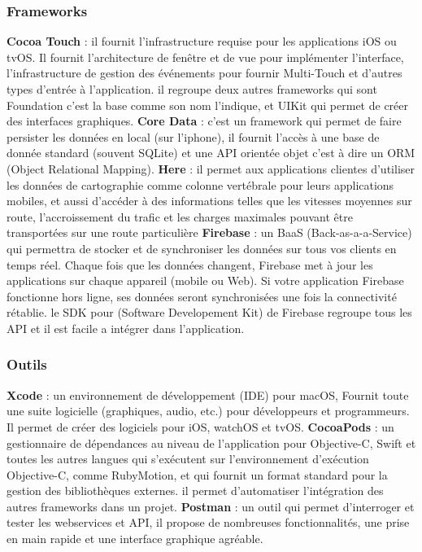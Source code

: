 \subsubsection{Frameworks} %
\label{ssub:subsubsection_name}
\begin{itemize}
	\itemb \textbf{Cocoa Touch} : il fournit l'infrastructure requise pour les applications iOS ou tvOS. Il fournit l'architecture de fenêtre et de vue pour implémenter l'interface, l'infrastructure de gestion des événements pour fournir Multi-Touch et d'autres types d'entrée à l'application.
	il regroupe deux autres frameworks qui sont Foundation c'est la base comme son nom l'indique, et UIKit
	qui permet de créer des interfaces graphiques.
	\itemb \textbf{Core Data} : c'est un framework qui permet de faire persister les données en local (sur l'iphone), il fournit l’accès à une base de donnée standard (souvent SQLite) et une API orientée objet c'est à dire un ORM (Object Relational Mapping).
	\itemb \textbf{Here} : il permet aux applications clientes d'utiliser les données de cartographie comme colonne vertébrale pour leurs applications mobiles, et aussi d'accéder à des informations telles que les vitesses moyennes sur route, l'accroissement du trafic et les charges maximales pouvant être transportées sur une route particulière
	\itemb \textbf{Firebase} : un BaaS (Back-as-a-a-Service) qui permettra de stocker et de synchroniser les données sur tous vos clients en temps réel. Chaque fois que les données changent, Firebase met à jour les applications sur chaque appareil (mobile ou Web). Si votre application Firebase fonctionne hors ligne, ses données seront synchronisées une fois la connectivité rétablie.\newline
	le SDK pour (Software Developement Kit) de Firebase regroupe tous les API et il est facile a intégrer dans l'application.
\end{itemize}

\subsubsection{Outils} %
\label{ssub:outils}
\begin{itemize}
	\itemb \textbf{Xcode} : un environnement de développement (IDE) pour macOS, Fournit toute une suite logicielle (graphiques, audio, etc.) pour développeurs et programmeurs. Il permet de créer des logiciels pour iOS, watchOS et tvOS.
	\itemb \textbf{CocoaPods} : un gestionnaire de dépendances au niveau de l'application pour Objective-C, Swift et toutes les autres langues qui s'exécutent sur l'environnement d'exécution Objective-C, comme RubyMotion, et qui fournit un format standard pour la gestion des bibliothèques externes. il permet d'automatiser l’intégration des autres frameworks dans un projet.
	\itemb \textbf{Postman} : un outil qui permet d'interroger et tester les webservices et API, il propose de nombreuses fonctionnalités, une prise en main rapide et une interface graphique agréable.
\end{itemize}

